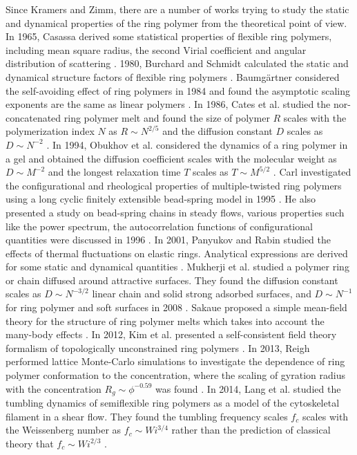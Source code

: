 Since Kramers and Zimm, there are a number of works trying to study the static and dynamical properties of the ring polymer from the theoretical point of view.
In 1965, Casassa derived some statistical properties of flexible ring polymers, including mean square radius, the second Virial coefficient and angular distribution of scattering \cite{Casassa1965}. 1980, Burchard and Schmidt calculated the static and dynamical structure factors of flexible ring polymers \cite{Burchard1980}. Baumg\"{a}rtner considered the self-avoiding effect of ring polymers in 1984 and found the asymptotic scaling exponents are the same as linear polymers \cite{Baumgartner1982a}. In 1986, Cates et al. studied the nor-concatenated ring polymer melt and found the size of polymer $R$ scales with the polymerization index $N$ as $R\sim N^{2/5}$ and the diffusion constant $D$ scales as $D\sim N^{-2}$ \cite{Cates1986}.  In 1994, Obukhov et al. considered the dynamics of a ring polymer in a gel and obtained the diffusion coefficient scales with the molecular weight as $D\sim M^{-2}$ and the longest relaxation time $T$ scales as $T\sim M^{5/2}$ \cite{Obukhov1994}. Carl investigated the configurational and rheological properties of multiple-twisted ring polymers using a long cyclic finitely extensible bead-spring model in 1995 \cite{Carl1995}. He also presented a study on bead-spring chains in steady flows, various properties such like the power spectrum, the autocorrelation functions of configurational quantities were discussed in 1996 \cite{Carl1996}.
In 2001, Panyukov and Rabin studied the effects of thermal fluctuations on elastic rings. Analytical expressions are derived for some static and dynamical quantities \cite{Panyukov2001}.  Mukherji et al. studied a polymer ring or chain diffused around attractive surfaces. They found the diffusion constant scales as $D \sim N^{-3/2}$ linear chain and solid strong adsorbed surfaces, and $D\sim N^{-1}$ for ring polymer and soft surfaces in 2008 \cite{Mukherji2008}. Sakaue proposed a simple mean-field theory for the structure of ring polymer melts which takes into account the many-body effects \cite{Sakaue2011,Sakaue2012}. In 2012, Kim et al. presented a self-consistent field theory formalism of topologically unconstrained ring polymers \cite{Kim2012}.  In 2013, Reigh performed lattice Monte-Carlo simulations to investigate the dependence of ring polymer conformation to the concentration, where the scaling of gyration radius with the concentration $R_g \sim \phi^{-0.59}$ was found \cite{Reigh2013}. In 2014, Lang et al. studied the tumbling dynamics of semiflexible ring polymers as a model of the cytoskeletal filament in a shear flow. They found the tumbling frequency scales $f_c$ scales with the Weissenberg number as $f_c \sim Wi^{3/4}$ rather than the prediction of classical theory that $f_c \sim Wi^{2/3}$ \cite{Lang2014b}.

